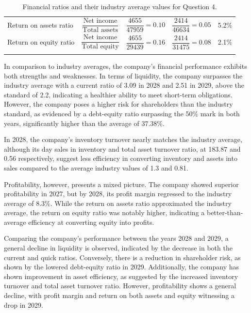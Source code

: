 \begin{table}[H]
\begin{adjustbox}{max width=\textwidth}
\begin{tabular}{@{}lcccc@{}}
            \addlinespace[1em]
            Return on assets ratio     & $\dfrac{\textrm{Net income}}{\textrm{Total assets}}$                                 & $\dfrac{4655}{47959} = 0.10$          & $\dfrac{2414}{46634} = 0.05$          & 5.2\%                     \\
            \addlinespace[1em]
            Return on equity ratio     & $\dfrac{\textrm{Net income}}{\textrm{Total equity}}$                                 & $\dfrac{4655}{29439} = 0.16$          & $\dfrac{2414}{31475} = 0.08$          & 2.1\%                     \\
            \addlinespace[0.5em]
            \bottomrule
        \end{tabular}
    \end{adjustbox}
    \caption{Financial ratios and their industry average values for Question 4.}
    \label{tab:finRatio1}
\end{table}
In comparison to industry averages, the company's financial performance exhibits both strengths and weaknesses. In terms of liquidity, the company surpasses the industry average with a current ratio of 3.09 in 2028 and 2.51 in 2029, above the standard of 2.2, indicating a healthier ability to meet short-term obligations. However, the company poses a higher risk for shareholders than the industry standard, as evidenced by a debt-equity ratio surpassing the 50\% mark in both years, significantly higher than the average of 37.38\%.

In 2028, the company's inventory turnover nearly matches the industry average, although its day sales in inventory and total asset turnover ratio, at 183.87 and 0.56 respectively, suggest less efficiency in converting inventory and assets into sales compared to the average industry values of 1.3 and 0.81.

Profitability, however, presents a mixed picture. The company showed superior profitability in 2027, but by 2028, its profit margin regressed to the industry average of 8.3\%. While the return on assets ratio approximated the industry average, the return on equity ratio was notably higher, indicating a better-than-average efficiency at converting equity into profits.

Comparing the company's performance between the years 2028 and 2029, a general decline in liquidity is observed, indicated by the decrease in both the current and quick ratios. Conversely, there is a reduction in shareholder risk, as shown by the lowered debt-equity ratio in 2029. Additionally, the company has shown improvement in asset efficiency, as suggested by the increased inventory turnover and total asset turnover ratio. However, profitability shows a general decline, with profit margin and return on both assets and equity witnessing a drop in 2029.